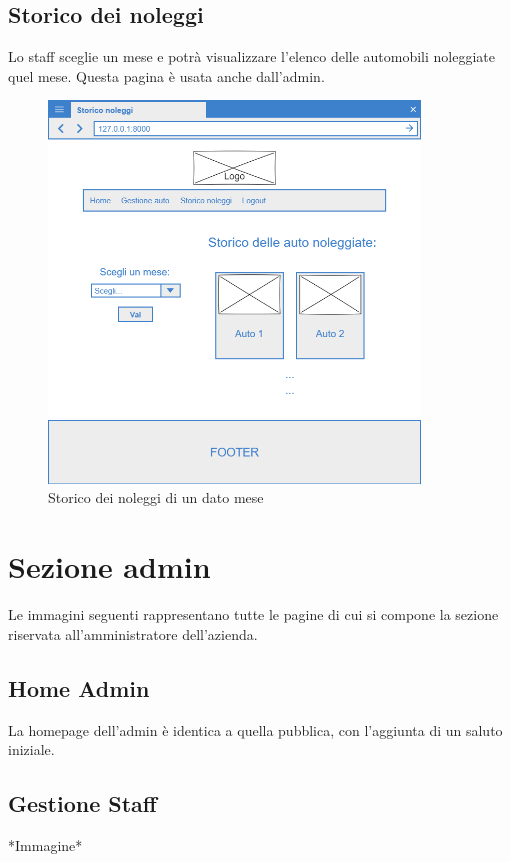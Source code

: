 \documentclass[12pt,a4paperS]{report}
\begin{document}
\begin{normalsize}
			\subsection{Storico dei noleggi}
				Lo staff sceglie un mese e potrà visualizzare l'elenco delle automobili noleggiate quel mese.
				\newline
				Questa pagina è usata anche dall'admin.
				\begin{figure}[H]
					\centering
					\includegraphics[width=0.88\textwidth, height=0.88\textheight, keepaspectratio]{Mockup/Storico_noleggi_staff.png}
					\caption{Storico dei noleggi di un dato mese}
				\end{figure}
				
		\section{Sezione admin}
			Le immagini seguenti rappresentano tutte le pagine di cui si compone la sezione riservata all'amministratore dell'azienda.
			
			\subsection{Home Admin}
				La homepage dell'admin è identica a quella pubblica, con l'aggiunta di un saluto iniziale.
			
			\subsection{Gestione Staff}
				*Immagine*
			

\end{normalsize}
\end{document}
